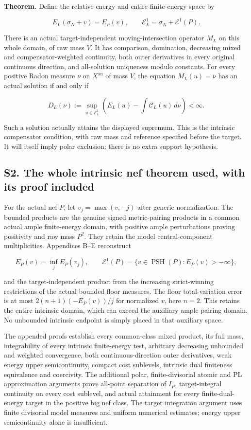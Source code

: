 \documentclass[
  10pt,
]{article}
\begin{document}
\textbf{Theorem.} Define the relative energy and entire
finite-energy space by

\[E_L(\sigma_N+v)=E_P(v),\qquad \mathcal E_L^1=\sigma_N+\mathcal E^1(P).\]

There is an actual target-independent moving-intersection operator
\(M_L\) on this whole domain, of raw mass \(V\). It has comparison,
domination, decreasing mixed and compensator-weighted continuity, both
outer derivatives in every original continuous direction, and
all-solution uniqueness modulo constants. For every positive Radon
measure \(\nu\) on \(X^{\mathrm{an}}\) of mass \(V\), the equation
\(M_L(u)=\nu\) has an actual solution if and only if

\[D_L(\nu):=\sup_{u\in\mathcal E_L^1}\left(E_L(u)-\int\mathcal C_L(u)\,d\nu\right)<\infty.\]

Such a solution actually attains the displayed supremum. This is the
intrinsic compensator condition, with raw mass and reference specified
before the target. It will itself imply polar exclusion; there is no
extra support hypothesis.

\subsection{S2. The whole intrinsic nef theorem used, with its proof
included}\label{s2.-the-whole-intrinsic-nef-theorem-used-with-its-proof-included}

For the actual nef \(P\), let \(v_j=\max(v,-j)\) after generic
normalization. The bounded products are the genuine signed
metric-pairing products in a common actual ample finite-energy domain,
with positive ample perturbations proving positivity and raw mass
\(P^2\). They retain the model central-component multiplicities.
Appendices B--E reconstruct

\[E_P(v)=\inf_j E_P(v_j),\qquad \mathcal E^1(P)=\{v\in\operatorname{PSH}(P):E_P(v)>-\infty\},\]

and the target-independent product from the increasing strict-winning
restrictions of the actual bounded floor measures. The floor
total-variation error is at most \(2(n+1)(-E_P(v))/j\) for normalized
\(v\), here \(n=2\). This retains the entire intrinsic domain, which can
exceed the auxiliary ample pairing domain. No unbounded intrinsic
endpoint is simply placed in that auxiliary space.

The appended proofs establish every common-class mixed product, its full
mass, integrability of every intrinsic finite-energy test, arbitrary
decreasing unbounded and weighted convergence, both continuous-direction
outer derivatives, weak energy upper semicontinuity, compact cost
sublevels, intrinsic dual finiteness equivalence and coercivity. The
additional polar, finite-divisorial atomic and PL approximation
arguments prove all-point separation of \(I_P\), target-integral
continuity on every cost sublevel, and actual attainment for every
finite-dual-energy target in the positive big nef class. The target
integration argument uses finite divisorial model measures and uniform
numerical estimates; energy upper semicontinuity alone is insufficient.
\end{document}
